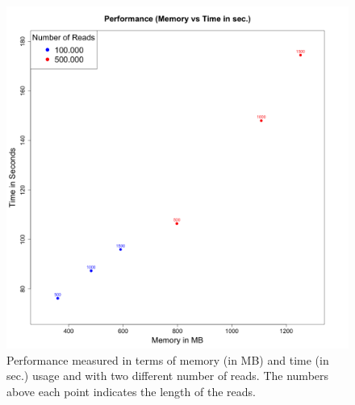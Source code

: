 \documentclass[10pt,a4paper]{article}
\begin{document}
\newpage
\begin{figure}[!ht]
\centering
\label{fig:performance}
\includegraphics[width=\textwidth]{../output/plots/plotPerformance}
\caption{\footnotesize Performance measured in terms of memory (in MB) and time (in sec.) usage and with two different number of reads. The numbers above each point indicates the length of the reads.}
\end{figure}
\end{document}
